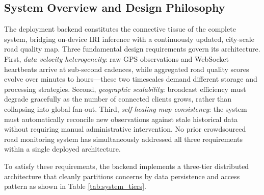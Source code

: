 \documentclass[conference]{IEEEtran}
\begin{document}
\subsection{System Overview and Design Philosophy}
The deployment backend constitutes the connective tissue of the complete system, bridging on-device IRI inference with a continuously updated, city-scale road quality map.
Three fundamental design requirements govern its architecture. First, \textit{data velocity heterogeneity}: raw GPS observations and WebSocket heartbeats arrive at sub-second cadences, while aggregated road quality scores evolve over minutes to hours---these two timescales demand different storage and processing strategies. Second, \textit{geographic scalability}: broadcast efficiency must degrade gracefully as the number of connected clients grows, rather than collapsing into global fan-out. Third, \textit{self-healing map consistency}: the system must automatically reconcile new observations against stale historical data without requiring manual administrative intervention. No prior crowdsourced road monitoring system has simultaneously addressed all three requirements within a single deployed architecture.

To satisfy these requirements, 
the backend implements a three-tier distributed architecture that cleanly partitions concerns by data persistence and access pattern as shown in Table \ref{tab:system_tiers}.

\begin{table}[htbp]
\centering
\caption{Three-Tier Distributed Architecture}
\label{tab:system_tiers}
\end{table}
\end{document}
